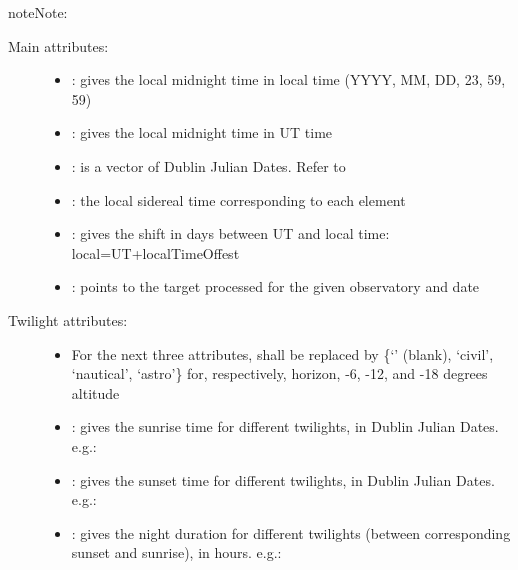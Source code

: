 \documentclass[letterpaper,10pt,english]{sphinxmanual}
\begin{document}
\begin{fulllineitems}
\begin{notice}{note}{Note:}
\begin{itemize}
\end{itemize}
\end{notice}
\begin{description}
\item[{Main attributes:}] \leavevmode\begin{itemize}
\item {} 
: gives the local midnight time in local time (YYYY, MM, DD, 23, 59, 59)

\item {} 
: gives the local midnight time in UT time

\item {} 
: is a vector of Dublin Julian Dates. Refer to 

\item {} 
: the local sidereal time corresponding to each  element

\item {} 
: gives the shift in days between UT and local time: local=UT+localTimeOffest

\item {} 
: points to the  target processed for the given observatory and date

\end{itemize}

\item[{Twilight attributes:}] \leavevmode\begin{itemize}
\item {} 
For the next three attributes,  shall be replaced by \{`' (blank), `civil', `nautical', `astro'\} for, respectively, horizon, -6, -12, and -18 degrees altitude

\item {} 
: gives the sunrise time for different twilights, in Dublin Julian Dates. e.g.: 

\item {} 
: gives the sunset time for different twilights, in Dublin Julian Dates. e.g.: 

\item {} 
: gives the night duration for different twilights (between corresponding sunset and sunrise), in hours. e.g.: 

\end{itemize}


\end{description}
\end{fulllineitems}
\end{document}
